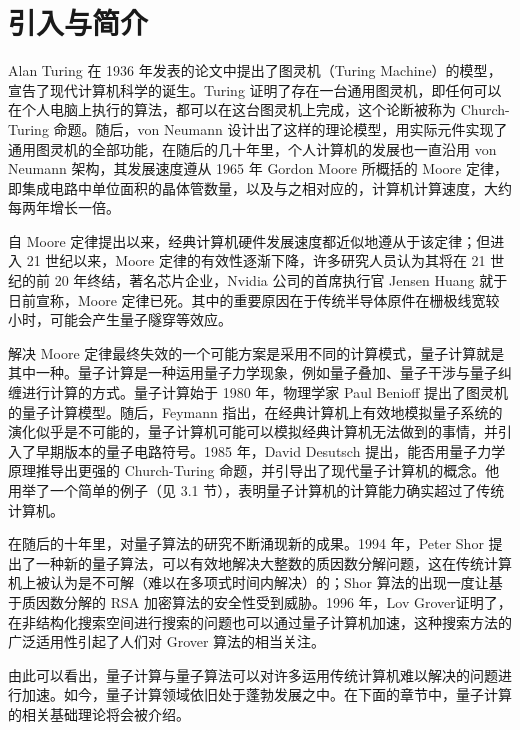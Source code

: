 \section{引入与简介}

Alan Turing 在 1936 年发表的论文中提出了图灵机（Turing Machine）的模型\cite{turing1936computable}，宣告了现代计算机科学的诞生。Turing 证明了存在一台通用图灵机，即任何可以在个人电脑上执行的算法，都可以在这台图灵机上完成，这个论断被称为 Church-Turing 命题。随后，von Neumann 设计出了这样的理论模型，用实际元件实现了通用图灵机的全部功能，在随后的几十年里，个人计算机的发展也一直沿用 von Neumann 架构，其发展速度遵从 1965 年 Gordon Moore 所概括的 Moore 定律，即集成电路中单位面积的晶体管数量，以及与之相对应的，计算机计算速度，大约每两年增长一倍\cite{moore1965cramming}。

自 Moore 定律提出以来，经典计算机硬件发展速度都近似地遵从于该定律；但进入 21 世纪以来，Moore 定律的有效性逐渐下降，许多研究人员认为其将在 21 世纪的前 20 年终结，著名芯片企业，Nvidia 公司的首席执行官 Jensen Huang 就于日前宣称，Moore 定律已死\cite{moorelawdead}。其中的重要原因在于传统半导体原件在栅极线宽较小时，可能会产生量子隧穿等效应\cite{kumar2015fundamental}。

解决 Moore 定律最终失效的一个可能方案是采用不同的计算模式，量子计算就是其中一种。量子计算是一种运用量子力学现象，例如量子叠加、量子干涉与量子纠缠进行计算的方式。量子计算始于 1980 年，物理学家 Paul Benioff 提出了图灵机的量子计算模型\cite{benioff1980computer}。随后，Feymann 指出，在经典计算机上有效地模拟量子系统的演化似乎是不可能的，量子计算机可能可以模拟经典计算机无法做到的事情\cite{feynman1981simulating}，并引入了早期版本的量子电路符号\cite{feynman1986quantum}。1985 年，David Desutsch 提出，能否用量子力学原理推导出更强的 Church-Turing 命题，并引导出了现代量子计算机的概念\cite{deutsch1985quantum}。他用举了一个简单的例子（见 3.1 节），表明量子计算机的计算能力确实超过了传统计算机。

在随后的十年里，对量子算法的研究不断涌现新的成果。1994 年，Peter Shor 提出了一种新的量子算法，可以有效地解决大整数的质因数分解问题\cite{shor1994algorithms}，这在传统计算机上被认为是不可解（难以在多项式时间内解决）的；Shor 算法的出现一度让基于质因数分解的 RSA 加密算法的安全性受到威胁\cite{mermin2006breaking}。1996 年，Lov Grover证明了，在非结构化搜索空间进行搜索的问题也可以通过量子计算机加速\cite{grover1996fast}，这种搜索方法的广泛适用性引起了人们对 Grover 算法的相当关注。

由此可以看出，量子计算与量子算法可以对许多运用传统计算机难以解决的问题进行加速。如今，量子计算领域依旧处于蓬勃发展之中。在下面的章节中，量子计算的相关基础理论将会被介绍。